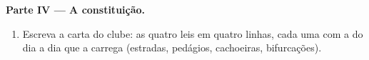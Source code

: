 \begin{problem}
\medskip\noindent\textbf{Parte IV --- A constituição.}
\begin{enumerate}[resume]
  \item Escreva a carta do clube: as quatro leis em quatro linhas,
        cada uma com a  do dia a dia que a carrega (estradas,
        pedágios, cachoeiras, bifurcações).
\end{enumerate}
\end{problem}
